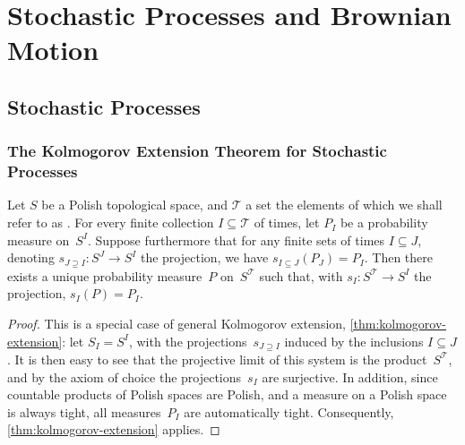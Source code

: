 \chapter	{Stochastic Processes and Brownian Motion}

\section	{Stochastic Processes}

\subsection	{The Kolmogorov Extension Theorem for Stochastic Processes}

\begin	{theorem}
\label	{thm:kolmogorov-extension-for-processes}
Let $S$ be a Polish topological space,
and $\mathcal T$ a set the elements of which we shall refer to as .
For every finite collection \( I \subseteq \mathcal T \) of times,
let \( P_I \) be a probability measure on~$S^I$.
Suppose furthermore that for any finite sets of times \( I \subseteq J \),
denoting \( s_{J \supseteq I} \colon S^J \to S^I \) the projection,
we have \( s_{I \subseteq J}(P_J) = P_I \).
Then there exists a unique probability measure~$P$ on~$S^{\mathcal T}$
such that, with \( s_I \colon S^{\mathcal T} \to S^I \)
the projection, \( s_I(P) = P_I \).
\end	{theorem}
\begin	{proof}
This is a special case of general Kolmogorov extension,
\autoref{thm:kolmogorov-extension}:
let \( S_I = S^I \), with the projections~$s_{J \supseteq I}$
induced by the inclusions \( I \subseteq J \).
It is then easy to see that the projective limit of this system
is the product~$S^{\mathcal T}$,
and by the axiom of choice the projections~$s_I$ are surjective.
In addition, since countable products of Polish spaces are Polish,
and a measure on a Polish space is always tight,
all measures~$P_I$ are automatically tight.
Consequently, \autoref{thm:kolmogorov-extension} applies.
\end	{proof}
